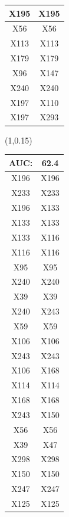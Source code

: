 \documentclass{beamer}
\newcommand{\boz}{\cellcolor{pathwaynode}}
\newcommand{\ghool}{\cellcolor{independentnode}}
\begin{document}
\begin{frame}[plain]
\begin{textblock*}{\paperwidth}
\begin{tabular}{| c c |}
X195   &  X195  \\ \hline
X56   &  X56  \\ \hline
\boz X113   &  \boz X113  \\ \hline
X179   &  X179  \\ \hline
\ghool X96   &  X147  \\ \hline
\boz X240   &  \boz X240  \\ \hline
X197   &  X110  \\ \hline
X197   &  X293  \\ \hline
    \end{tabular}
    \hspace{.5em}
  \end{textblock*}
  \begin{textblock*}{\paperwidth}(1\textwidth,0.15\textheight)
    \raggedright 
    \tiny
    \begin{tabular}{| c c |}
      \hline
AUC: & 62.4 \\ \hline \hline
\boz X196   &  \boz X196  \\ \hline
X233   &  X233  \\ \hline
\boz X196   &  \boz X133  \\ \hline
\boz X133   &  \boz X133  \\ \hline
\boz X133   &  \boz X116  \\ \hline
\boz X116   &  \boz X116  \\ \hline
X95   &  X95  \\ \hline
\boz X240   &  \boz X240  \\ \hline
X39   &  X39  \\ \hline
\boz X240   &  \boz X243  \\ \hline
X59   &  X59  \\ \hline
X106   &  X106  \\ \hline
\boz X243   &  \boz X243  \\ \hline
X106   &  X168  \\ \hline
X114   &  X114  \\ \hline
X168   &  X168  \\ \hline
\boz X243   &  \boz X150  \\ \hline
X56   &  X56  \\ \hline
X39   &  X47  \\ \hline
X298   &  X298  \\ \hline
\boz X150   &  \boz X150  \\ \hline
X247   &  X247  \\ \hline
\boz X125   &  \boz X125  \\ \hline

\end{tabular}
\end{textblock*}
\end{frame}
\end{document}
